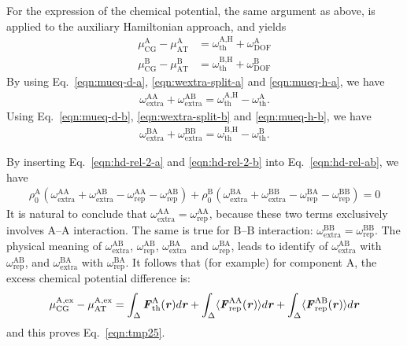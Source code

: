 \documentclass[a4paper,preprint,unsortedaddress]{revtex4-1}
\newcommand{\vect}[1]{\textbf{\textit{#1}}}
\newcommand{\dof}{{\textrm{DOF}}}
\newcommand{\AT}{{\textrm{{AT}}}}
\newcommand{\CG}{{\textrm{CG}}}
\newcommand{\thf}{{\textrm{th}}}
\newcommand{\res}{{\textrm{rep}}}
\newcommand{\ext}{{\textrm{extra}}}
\newcommand{\exc}{{\textrm{ex}}}
\newcommand{\hadress}{{\textrm{H}}}
\newcommand{\typea}{{\textrm{A}}}
\newcommand{\typeb}{{\textrm{B}}}
\begin{document}
{For the expression of the chemical potential, the same argument as above, is applied to the auxiliary Hamiltonian approach, and
yields
\begin{align}\label{eqn:mueq-h-a}
 \mu^\typea_\CG - \mu^\typea_\AT &=   \omega^{\typea,\hadress}_\thf + \omega^\typea_\dof \\\label{eqn:mueq-h-b}
 \mu^\typeb_\CG - \mu^\typeb_\AT &=   \omega^{\typeb,\hadress}_\thf + \omega^\typeb_\dof
\end{align}
By using Eq.~\eqref{eqn:mueq-d-a}, \eqref{eqn:wextra-split-a} and \eqref{eqn:mueq-h-a}, we have
\begin{align}\label{eqn:hd-rel-2-a}
  \omega^{\typea\typea}_\ext + \omega^{\typea\typeb}_\ext
  = \omega^{\typea,\hadress}_\thf - \omega^\typea_\thf.
\end{align}
Using Eq.~\eqref{eqn:mueq-d-b}, \eqref{eqn:wextra-split-b} and \eqref{eqn:mueq-h-b}, we have
\begin{align}\label{eqn:hd-rel-2-b}
  \omega^{\typeb\typea}_\ext + \omega^{\typeb\typeb}_\ext
  = \omega^{\typeb,\hadress}_\thf - \omega^\typeb_\thf.
\end{align}

By inserting Eq.~\eqref{eqn:hd-rel-2-a} and \eqref{eqn:hd-rel-2-b} into
Eq.~\eqref{eqn:hd-rel-ab}, we have
\begin{align}\label{eqn:hd-rel-ab-1}
  \rho_0^\typea(\omega_\ext^{\typea\typea} + \omega_\ext^{\typea\typeb}
  - \omega^{\typea\typea}_\res - \omega^{\typea\typeb}_\res)
  +
  \rho_0^\typeb(\omega_\ext^{\typeb\typea} + \omega_\ext^{\typeb\typeb}
  - \omega^{\typeb\typea}_\res - \omega^{\typeb\typeb}_\res) = 0
\end{align}
It is natural to conclude that
$\omega_\ext^{\typea\typea} = \omega_\res^{\typea\typea} $,
because  these two terms exclusively
involves $\typea$--$\typea$ interaction.
The same is true for $\typeb$--$\typeb$ interaction:
$\omega_\ext^{\typeb\typeb} = \omega_\res^{\typeb\typeb} $.
The physical meaning of $\omega_\ext^{\typea\typeb}$,
$\omega_\res^{\typea\typeb}$, $\omega_\ext^{\typeb\typea}$ and
$\omega_\res^{\typeb\typea}$, leads to 
identify of $\omega_\ext^{\typea\typeb}$ with $\omega_\res^{\typea\typeb}$,
and $\omega_\ext^{\typeb\typea}$ with $\omega_\res^{\typeb\typea}$.
It follows that (for example) for component $\typea$, the excess chemical potential difference is:
\begin{equation}
\mu^{\typea,\exc}_{\CG}-\mu^{\typea,\exc}_{\AT}=\int _{\Delta}{\vect F}^{\typea}_{\thf}({\vect r})d{\vect r}+\int_{\Delta} \langle \vect F^{\typea\typea}_\res(\vect r)\rangle d{\vect r}+\int_{\Delta} \langle \vect F^{\typea\typeb}_\res(\vect r)\rangle d{\vect r}
\label{fineq}
\end{equation}
 and this proves Eq.~\eqref{eqn:tmp25}.}
\end{document}
